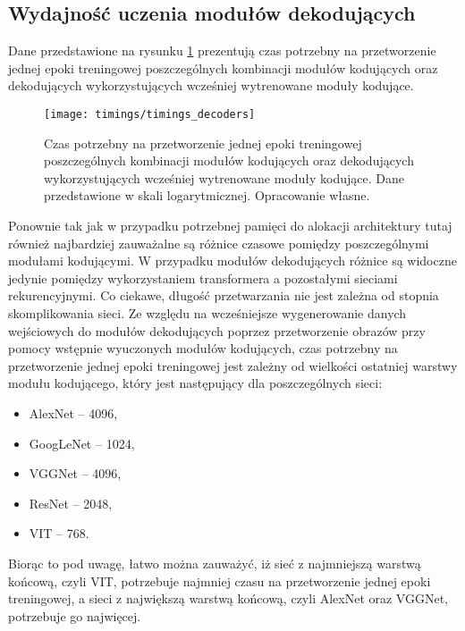 \subsection{Wydajność uczenia modułów dekodujących}
Dane przedstawione na rysunku \ref{fig:timings-decoders} prezentują czas potrzebny na przetworzenie jednej epoki treningowej poszczególnych kombinacji modułów kodujących oraz dekodujących wykorzystujących wcześniej wytrenowane moduły kodujące.
\begin{figure}[H]
    \centering
    \texttt{[image: timings/timings\_decoders]}
    \caption{Czas potrzebny na przetworzenie jednej epoki treningowej poszczególnych kombinacji modułów kodujących oraz dekodujących wykorzystujących wcześniej wytrenowane moduły kodujące. Dane przedstawione w skali logarytmicznej. Opracowanie własne.}
    \label{fig:timings-decoders}
\end{figure}
\noindent Ponownie tak jak w przypadku potrzebnej pamięci do alokacji architektury tutaj również najbardziej zauważalne są różnice czasowe pomiędzy poszczególnymi modułami kodującymi. W przypadku modułów dekodujących różnice są widoczne jedynie pomiędzy wykorzystaniem transformera a pozostałymi sieciami rekurencyjnymi. Co ciekawe, długość przetwarzania nie jest zależna od stopnia skomplikowania sieci. Ze względu na wcześniejsze wygenerowanie danych wejściowych do modułów dekodujących poprzez przetworzenie obrazów przy pomocy wstępnie wyuczonych modułów kodujących, czas potrzebny na przetworzenie jednej epoki treningowej jest zależny od wielkości ostatniej warstwy modułu kodującego, który jest następujący dla poszczególnych sieci:
\begin{itemize}
    \item AlexNet -- 4096,
    \item GoogLeNet -- 1024,
    \item VGGNet -- 4096,
    \item ResNet -- 2048,
    \item VIT -- 768.
\end{itemize}
Biorąc to pod uwagę, łatwo można zauważyć, iż sieć z najmniejszą warstwą końcową, czyli VIT, potrzebuje najmniej czasu na przetworzenie jednej epoki treningowej, a sieci z największą warstwą końcową, czyli AlexNet oraz VGGNet, potrzebuje go najwięcej.
